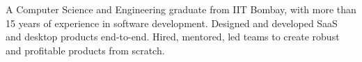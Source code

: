 

\begin{cvparagraph}

A Computer Science and Engineering graduate from IIT Bombay, with more than 15 years of experience in software development. Designed and developed SaaS and desktop products end-to-end. Hired, mentored, led teams to create robust and profitable products from scratch.
\end{cvparagraph}
